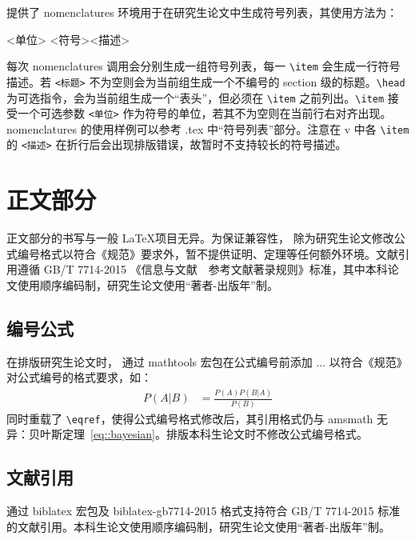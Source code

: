 \documentclass[bachelor, comfort]{shtthesis}
\begin{document}
\shtthesis{} 提供了 nomenclatures 环境用于在研究生论文中生成符号列表，其使用方法为：
\begin{latex}
\begin{nomenclatures}[<标题>]
  \item[<单位>]{<符号>}{<描述>}
\end{nomenclatures}
\end{latex}
每次 nomenclatures 调用会分别生成一组符号列表，每一 \verb|\item| 会生成一行符号描述。若 \verb|<标题>| 不为空则会为当前组生成一个不编号的 section 级的标题。\verb|\head| 为可选指令，会为当前组生成一个“表头”，但必须在 \verb|\item| 之前列出。\verb|\item| 接受一个可选参数 \verb|<单位>| 作为符号的单位，若其不为空则在当前行右对齐出现。nomenclatures 的使用样例可以参考 \jobname.tex 中“符号列表”部分。注意在 \shtthesis{} v\version{} 中各 \verb|\item| 的 \verb|<描述>| 在折行后会出现排版错误，故暂时不支持较长的符号描述。

\section{正文部分}
\shtthesis{} 正文部分的书写与一般 \LaTeX 项目无异。为保证兼容性，\shtthesis{} 除为研究生论文修改公式编号格式以符合《规范》要求外，暂不提供证明、定理等任何额外环境。文献引用遵循 GB/T 7714-2015 《信息与文献　参考文献著录规则》标准，其中本科论文使用顺序编码制，研究生论文使用“著者-出版年”制。

\subsection{编号公式}
在排版研究生论文时，\shtthesis{} 通过 \textsf{mathtools} 宏包在公式编号前添加 $\ldots$ 以符合《规范》对公式编号的格式要求，如：
\begin{align}
P(A|B) &= \frac{P(A)P(B|A)}{P(B)} \label{eq::bayesian}
\end{align}
同时重载了 \verb|\eqref|，使得公式编号格式修改后，其引用格式仍与 \textsf{amsmath} 无异：贝叶斯定理~\eqref{eq::bayesian}。排版本科生论文时不修改公式编号格式。

\subsection{文献引用} \label{sec::citation}
\shtthesis{} 通过 \textsf{biblatex} 宏包及 \textsf{biblatex-gb7714-2015} 格式支持符合 GB/T 7714-2015 标准的文献引用。本科生论文使用顺序编码制，研究生论文使用“著者-出版年”制。
\end{document}
